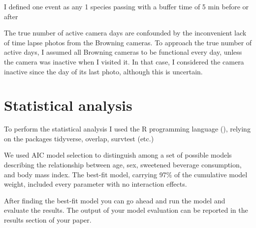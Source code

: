 I defined one event as any 1 species passing with a buffer time of 5 min before or after %



The true number of active camera days are confounded by the inconvenient lack of time lapse photos from the Browning cameras. To approach the true number of active days, I assumed all Browning cameras to be functional every day, unless the camera was inactive when I visited it. In that case, I considered the camera inactive since the day of its last photo, although this is uncertain.



\section{Statistical analysis} %
To perform the statistical analysis I used the R programming language (\cite{R}), relying on the packages tidyverse, overlap, survtest (etc.)






We used AIC model selection to distinguish among a set of possible models describing the relationship between age, sex, sweetened beverage consumption, and body mass index. The best-fit model, carrying 97\%
 of the cumulative model weight, included every parameter with no interaction effects.

After finding the best-fit model you can go ahead and run the model and evaluate the results. The output of your model evaluation can be reported in the results section of your paper.

